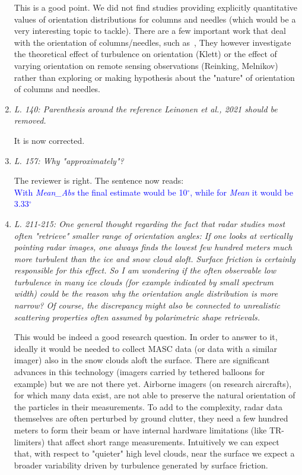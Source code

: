 \documentclass[12pt]{article}
\newcommand*{\blue}{\textcolor{blue}}
\begin{document}
\begin{enumerate}
    This is a good point. We did not find studies providing explicitly quantitative values of orientation distributions for columns and needles (which would be a very interesting topic to tackle). There are a few important work that deal with the orientation of columns/needles, such as~\cite{Klett_JAS_1995, Reinking_JAMC_1997, Melnikov_JAOT_2013}, They however investigate the theoretical effect of turbulence on orientation (Klett) or the effect of varying orientation on remote sensing observations (Reinking, Melnikov) rather than exploring or making hypothesis about the "nature" of orientation of columns and needles. 

    \item \textit{L. 140: Parenthesis around the reference Leinonen et al., 2021 should be removed.}
    
    \noindent
    It is now corrected.\\

    \item \textit{L. 157: Why "approximately"?}

    \noindent
    The reviewer is right. The sentence now reads:\\
    \blue{With \textit{Mean\_Abs} the final estimate would be 10$^\circ$, while for \textit{Mean} it would be 3.33$^\circ$}\\


    \item \textit{L. 211-215: One general thought regarding the fact that radar studies most often "retrieve" smaller range of orientation angles: If one looks at vertically pointing radar images, one always finds the lowest few hundred meters much more turbulent than the ice and snow cloud aloft. Surface friction is certainly responsible for this effect. So I am wondering if the often observable low turbulence in many ice clouds (for example indicated by small spectrum width) could be the reason why the orientation angle distribution is more narrow? Of course, the discrepancy might also be connected to unrealistic scattering properties often assumed by polarimetric shape retrievals.}

    This would be indeed a good research question. In order to answer to it, ideally it would be needed to collect MASC data (or data with a similar imager) also in the snow clouds aloft the surface. There are significant advances in this technology (imagers carried by tethered balloons for example) but we are not there yet. Airborne imagers (on research aircrafts), for which many data exist, are not able to preserve the natural orientation of the particles in their measurements. To add to the complexity, radar data themselves are often perturbed by ground clutter, they need a few hundred meters to form their beam or have internal hardware limitations (like TR-limiters) that affect short range measurements. Intuitively we can expect that, with respect to "quieter" high level clouds, near the surface we expect a broader variability driven by turbulence generated by surface friction.  


\end{enumerate}
\end{document}

